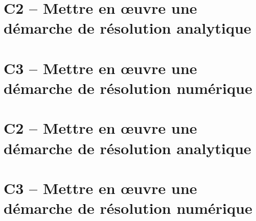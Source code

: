 \setcounter{numexo}{0}

\proffalse

%
%

\section{C2 -- Mettre en œuvre une démarche de résolution analytique}
\begin{multicols}{2}
%
%

%
%
%
%
%
%
%
%
\end{multicols}


\section{C3 -- Mettre en œuvre une démarche de résolution numérique}
\begin{multicols}{2}
\end{multicols}

\newpage
\proftrue
%
%
%


\section{C2 -- Mettre en œuvre une démarche de résolution analytique}
%
%

%
%
%
%
%
%
%
%




\section{C3 -- Mettre en œuvre une démarche de résolution numérique}

